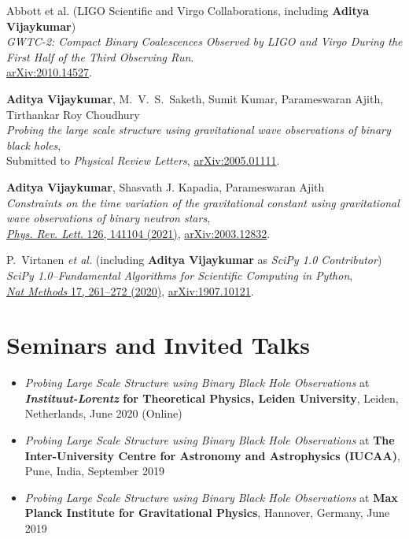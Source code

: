 \documentclass[margin, centered]{res}
\begin{document}
\begin{resume}
\begin{etaremune}
	
	
	\item Abbott et al. (LIGO Scientific and Virgo Collaborations, including \textbf{Aditya Vijaykumar})\\
	\textit{	GWTC-2: Compact Binary Coalescences Observed by LIGO and Virgo During the First Half of the Third Observing Run}.\\
	\href{https://arxiv.org/abs/2010.14527}{arXiv:2010.14527}.
	
	\item 
	\textbf{Aditya Vijaykumar}, M.~V.~S.~Saketh, Sumit Kumar, Parameswaran Ajith, Tirthankar Roy Choudhury\\
	\textit{Probing the large scale structure using gravitational wave observations of binary black holes},\\
	Submitted to \textit{Physical Review Letters}, \href{https://arxiv.org/abs/2005.01111}{arXiv:2005.01111}. 
	
	\item 
	\textbf{Aditya Vijaykumar}, Shasvath J. Kapadia, Parameswaran Ajith\\
	\textit{Constraints on the time variation of the gravitational constant using gravitational wave observations of binary neutron stars},\\
	\href{https://journals.aps.org/prl/abstract/10.1103/PhysRevLett.126.141104}{\textit{Phys. Rev. Lett}. 126, 141104 (2021)}, \href{https://arxiv.org/abs/2003.12832}{arXiv:2003.12832}. 
	
	\item 
	P.~Virtanen {\it et al.} (including \textbf{Aditya Vijaykumar} as \textit{SciPy 1.0 Contributor})\\
	\textit{SciPy 1.0--Fundamental Algorithms for Scientific Computing in Python},\\
	\href{https://www.nature.com/articles/s41592-019-0686-2}{\textit{Nat Methods} 17, 261–272 (2020)},
	\href{https://arxiv.org/abs/1907.10121}{arXiv:1907.10121}.
\end{etaremune}

\section{Seminars and Invited Talks}
\begin{itemize}[leftmargin=*]
	 \item \textit{Probing Large Scale Structure using Binary Black Hole Observations} at \textbf{\textit{Instituut-Lorentz} for Theoretical Physics, Leiden University}, Leiden, Netherlands, June 2020 (Online)
	 \item \textit{Probing Large Scale Structure using Binary Black Hole Observations} at \textbf{The Inter-University Centre for Astronomy and Astrophysics (IUCAA)}, Pune, India, September 2019
	 \item \textit{Probing Large Scale Structure using Binary Black Hole Observations} at \textbf{Max Planck Institute for Gravitational Physics}, Hannover, Germany, June 2019
\end{itemize}


\end{resume}
\end{document}
